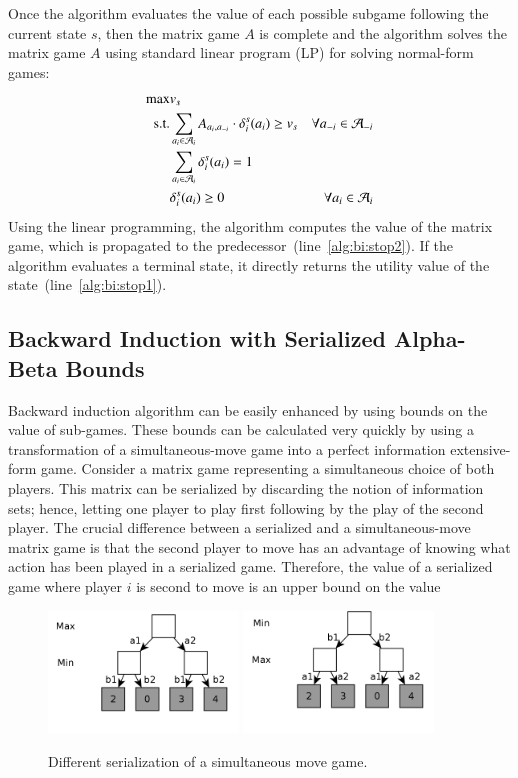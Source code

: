 Once the algorithm evaluates the value of each possible subgame following the current state $s$, then the matrix game $A$ is complete and the algorithm solves the matrix game $A$ using standard linear program (LP) for solving normal-form games:
\begin{eqnarray}
\max & v_s & \\
\textrm{s.t.} & \sum_{a_i \in \mathcal{A}_{i}}A_{a_i,a_{-i}} \cdot \delta^{s}_i(a_i) \geq v_s & \forall a_{-i} \in \mathcal{A}_{-i}\\
& \sum_{a_{i} \in \mathcal{A}_{i}} \delta^{s}_{i}(a_{i}) = 1 \\
& \delta^{s}_{i}(a_{i}) \geq 0 & \forall a_{i} \in \mathcal{A}_{i} 
\end{eqnarray}
Using the linear programming, the algorithm computes the value of the matrix game, which is propagated to the predecessor~(line~\ref{alg:bi:stop2}). 
If the algorithm evaluates a terminal state, it directly returns the utility value of the state~(line~\ref{alg:bi:stop1}).

\subsection{Backward Induction with Serialized Alpha-Beta Bounds}\label{sec:algs:biab}
Backward induction algorithm can be easily enhanced by using bounds on the value of sub-games. 
These bounds can be calculated very quickly by using a transformation of a simultaneous-move game into a perfect information extensive-form game.
Consider a matrix game representing a simultaneous choice of both players.
This matrix can be serialized by discarding the notion of information sets; hence, letting one player to play first following by the play of the second player. 
The crucial difference between a serialized and a simultaneous-move matrix game is that the second player to move has an advantage of knowing what action has been played in a serialized game.
Therefore, the value of a serialized game where player $i$ is second to move is an upper bound on the value 

\begin{figure}
\includegraphics[width=0.45\textwidth]{figures/serialization1-1.png}
\includegraphics[width=0.45\textwidth]{figures/serialization1-2.png}
\caption{Different serialization of a simultaneous move game.}\label{fig:serialization}
\end{figure}

